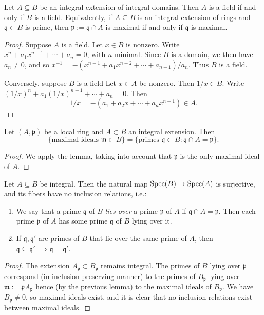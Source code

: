 \documentclass[10pt]{article}
\begin{document}
\begin{lemma}
  Let $A \subseteq B$ be an integral extension of integral
  domains.
  Then $A$ is a field if and only if $B$ is a field.
  Equivalently, if $A \subseteq B$  is an integral extension of rings
  and $\mathfrak{q} \subset B$ is prime,
  then $\mathfrak{p} := \mathfrak{q} \cap A$ is maximal if and only if
  $\mathfrak{q}$ is maximal.
\end{lemma}
\begin{proof}
  Suppose $A$ is a field.  Let $x \in B$ is nonzero.  Write
  $x^n + a_1 x^{n-1} + \dotsb + a_n = 0$, with $n$ minimal.
  Since $B$ is a domain, we then have $a_n \neq 0$, and so
  $x^{-1} = -(x^{n-1} + a_1 x^{n-2} + \dotsb + a_{n-1})/a_n$.
  Thus $B$ is a field.

  Conversely, suppose $B$ is a field Let $x \in A$ be nonzero.
  Then $1/x \in B$.  Write
  $(1/x)^n + a_1 (1/x)^{n-1} + \dotsb + a_n = 0$.  Then
  \[
  1/x = - (a_1 + a_2 x + \dotsb + a_n x^{n-1}) \in A.
  \]
\end{proof}
\begin{corollary}
  Let $(A,\mathfrak{p})$ be a local ring
  and $A \subset B$ an integral extension.
  Then
  \[
  \{\text{maximal ideals $\mathfrak{m} \subset B$}\}
  =
  \{\text{primes $\mathfrak{q} \subset B$} : \mathfrak{q} \cap A = \mathfrak{p} \}.
  \]
\end{corollary}
\begin{proof}
  We apply the lemma, taking into account that $\mathfrak{p}$ is the only maximal ideal of $A$.
\end{proof}


\begin{theorem}
  Let $A \subseteq B$ be integral.
  Then the natural map $\operatorname{Spec}(B) \rightarrow \operatorname{Spec}(A)$ is
  surjective,
  and its fibers have no inclusion relations, i.e.:
  \begin{enumerate}
  \item
    We say that a prime $\mathfrak{q}$ of $B$ \emph{lies over}
    a prime $\mathfrak{p}$ of $A$ if $\mathfrak{q} \cap A =
    \mathfrak{p}$.
    Then each prime $\mathfrak{p}$ of $A$ has some prime
    $\mathfrak{q}$ of $B$ lying over it.
  \item If $\mathfrak{q}, \mathfrak{q} '$ are primes
    of $B$ that lie over the same prime of $A$,
    then $\mathfrak{q} \subseteq \mathfrak{q} ' \implies \mathfrak{q} = \mathfrak{q} '$.
  \end{enumerate}
\end{theorem}
\begin{proof}
  The extension $A_\mathfrak{p} \subset B_\mathfrak{p}$ remains
  integral.
  The primes of $B$ lying over $\mathfrak{p}$ correspond
  (in inclusion-preserving manner)
  to the primes of $B_\mathfrak{p}$ lying over $\mathfrak{m} :=
  \mathfrak{p} A_\mathfrak{p}$
  hence (by the previous lemma) to the maximal ideals of
  $B_\mathfrak{p}$.
  We have $B_\mathfrak{p} \neq 0$,
  so maximal ideals exist, and it is clear that no inclusion
  relations
  exist between maximal ideals.
\end{proof}
\end{document}

